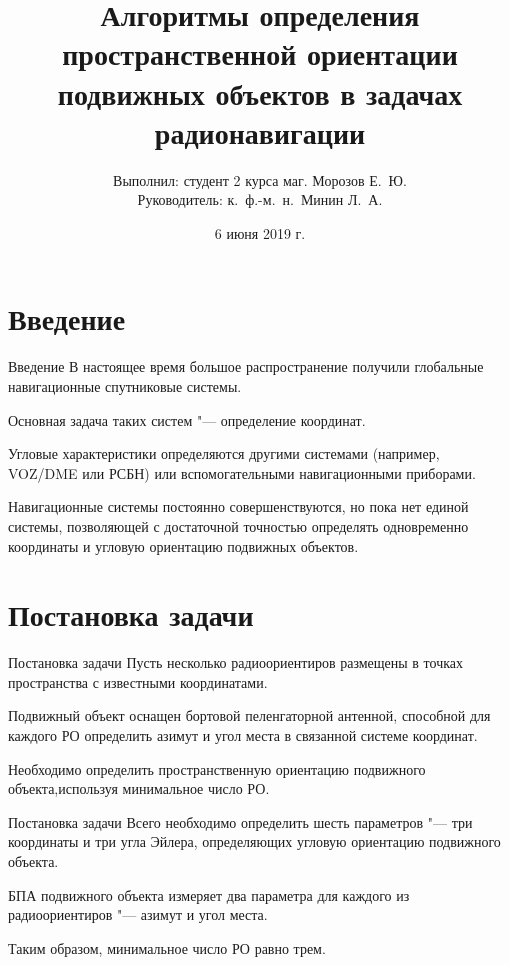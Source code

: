 \documentclass[russian,hyperref={unicode}]{beamer}
\title{Алгоритмы определения пространственной ориентации подвижных объектов в задачах радионавигации}
\institute
{
  Воронежский Государственный Университет \\
  Факультет Компьютерных Наук \\
  Кафедра Цифровых Технологий
}
\author
{
  Выполнил: студент 2 курса маг. Морозов Е.~Ю. \\
  Руководитель: к.~ф.-м.~н.~Минин Л.~А.
}
\date{6 июня 2019 г.}
\begin{document}
  \frame{\titlepage}

  \section{Введение}
  \begin{frame}{Введение}
    В настоящее время большое распространение получили глобальные навигационные спутниковые системы.

    Основная задача таких систем "--- определение координат.

    Угловые характеристики определяются другими системами (например, VOZ/DME или РСБН) или вспомогательными навигационными приборами.

    Навигационные системы постоянно совершенствуются, но пока нет единой системы, позволяющей с достаточной точностью определять одновременно координаты и угловую ориентацию подвижных объектов.~\nocite{WMMU:2019:IIS, WMMU:2019:RLNC, WMMU:2019:ANTENNAS, WMM:2018}
  \end{frame}


  \section{Постановка задачи}
  \begin{frame}{Постановка задачи}
      Пусть несколько радиоориентиров размещены в точках пространства с известными координатами.

      Подвижный объект оснащен бортовой пеленгаторной антенной, способной для каждого РО определить азимут и угол места в связанной системе координат.

      Необходимо определить пространственную ориентацию подвижного объекта,используя минимальное число РО.
  \end{frame}

  \begin{frame}{Постановка задачи}
    Всего необходимо определить шесть параметров "--- три координаты и три угла Эйлера, определяющих угловую ориентацию подвижного объекта.

    БПА подвижного объекта измеряет два параметра для каждого из радиоориентиров "--- азимут и угол места.

    Таким образом, минимальное число РО равно трем.
  \end{frame}
\end{document}
